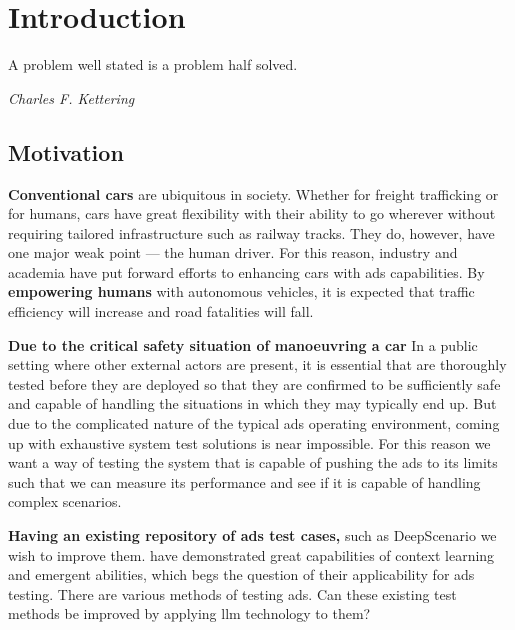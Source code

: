 \chapter{Introduction}\label{chp:introduction}

\epigraph{A problem well stated is a problem half solved.}{\textit{Charles F. Kettering}}

\section{Motivation}

\textbf{Conventional cars} are ubiquitous in society. Whether for freight trafficking or for humans, cars have great flexibility with their ability to go wherever without requiring tailored infrastructure
such as railway tracks. They do, however, have one major weak point --- the human driver. For this
reason, industry and academia have put forward efforts to enhancing cars with \acrfull{ads}
capabilities.
By \textbf{empowering humans} with autonomous vehicles, it is expected that traffic efficiency will
increase and road fatalities will fall.

\textbf{Due to the critical safety situation of manoeuvring a car} In a public setting where other external
actors are present, it is essential that  are thoroughly tested before they are
deployed so that they are confirmed to be sufficiently safe and capable of handling the situations in which
they may typically end up.
But due to the complicated nature of the typical \acrshort{ads} operating environment, coming up with
exhaustive system test solutions is near impossible.
For this reason we want a way of testing the system that is capable of pushing the \acrlong{ads} to
its limits such that we can measure its performance and see if it is capable of
handling complex scenarios.

\textbf{Having an existing repository of \acrlong{ads} test cases,} such as
DeepScenario we wish to improve them. \textbf{} have demonstrated
great capabilities of context learning and emergent abilities, which begs
the question of their  applicability for \acrshort{ads} testing.  There are
various methods of testing  \acrlong{ads}. Can these existing test methods be
improved by applying \acrshort{llm} technology to them?


